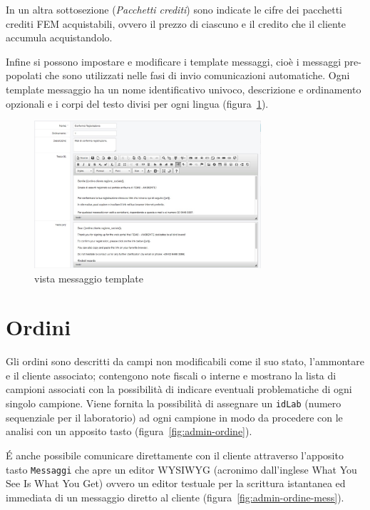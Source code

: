 In un altra sottosezione (\emph{Pacchetti crediti}) sono indicate le cifre dei \textsf{pacchetti crediti FEM} acquistabili, ovvero il prezzo di ciascuno e il credito che il cliente accumula acquistandolo.

Infine si possono impostare e modificare i \textsf{template messaggi}, cioè i messaggi pre-popolati che sono utilizzati nelle fasi di invio comunicazioni automatiche. Ogni template messaggio ha un nome identificativo univoco, descrizione e ordinamento opzionali e i corpi del testo divisi per ogni lingua (figura~\ref{fig:admin-template-mess}).

\begin{figure}
 \centering
 \includegraphics[width=0.75\textwidth]{images/admin-template-mess}
 \caption{vista messaggio template}
 \label{fig:admin-template-mess}
\end{figure}

\section*{Ordini}
Gli \textsf{ordini} sono descritti da campi non modificabili come il suo stato, l'ammontare e il cliente associato; contengono note fiscali o interne e mostrano la lista di campioni associati con la possibilità di indicare eventuali problematiche di ogni singolo campione. Viene fornita la possibilità di assegnare un \texttt{idLab} (numero sequenziale per il laboratorio) ad ogni campione in modo da procedere con le analisi con un apposito tasto (figura~\ref{fig:admin-ordine}). 

É anche possibile comunicare direttamente con il cliente attraverso l'apposito tasto \texttt{Messaggi} che apre un editor WYSIWYG (acronimo dall'inglese What You See Is What You Get) ovvero un editor testuale per la scrittura istantanea ed immediata di un messaggio diretto al cliente (figura~\ref{fig:admin-ordine-mess}).

